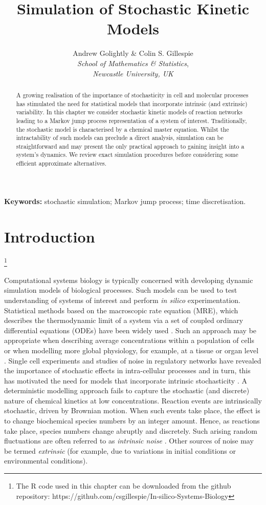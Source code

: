 \documentclass[12pt, DIV12]{scrartcl}
\title{\textbf{Simulation of Stochastic Kinetic Models}}
\author{Andrew Golightly \& Colin S. Gillespie\\ 
\emph{School of Mathematics \& Statistics},\\\emph{Newcastle University, UK}}
\date{}
\begin{document}
\maketitle
\begin{abstract}
  \noindent A growing realisation of the importance of stochasticity in cell and
  molecular processes has stimulated the need for statistical models that
  incorporate intrinsic (and extrinsic) variability. In this chapter we consider
  stochastic kinetic models of reaction networks leading to a Markov jump
  process representation of a system of interest. Traditionally, the stochastic
  model is characterised by a chemical master equation. Whilst the
  intractability of such models can preclude a direct analysis, simulation can
  be straightforward and may present the only practical approach to gaining
  insight into a system's dynamics. We review exact simulation procedures before
  considering some efficient approximate alternatives.
  \end{abstract}
\noindent \textbf{Keywords:} stochastic simulation; Markov jump process; time discretisation.
\section{Introduction}\label{sec:intro}

\let\thefootnote\relax\footnote{The R code used in this chapter can be downloaded
  from the github repository: https://github.com/csgillespie/In-silico-Systems-Biology}

Computational systems biology is typically 
concerned with developing dynamic simulation models of biological processes. 
Such models can be used to test understanding of systems of interest 
and perform \emph{in silico} experimentation. Statistical methods 
based on the macroscopic rate equation (MRE), which describes the thermodynamic 
limit of a system via a set of coupled ordinary differential equations (ODEs) 
have been widely used \citep{deJong02,Finkenstadt08}. Such an approach may be appropriate 
when describing average concentrations within a population of cells or when modelling 
more global physiology, for example, at a tissue or organ level \citep{Calderhead11}. 
Single cell experiments and studies of noise in regulatory networks have revealed the 
importance of stochastic effects in intra-cellular processes and in turn, this 
has motivated the need for models that incorporate intrinsic stochasticity 
\citep{wilkinson2009}. A deterministic modelling approach fails to capture the 
stochastic (and discrete) nature of chemical kinetics at low concentrations. 
Reaction events are intrinsically stochastic, driven by Brownian motion. When such 
events take place, the effect is to change biochemical species numbers by an integer 
amount. Hence, as reactions take place, species numbers change abruptly and discretely. 
Such arising random fluctuations are often referred to as \emph{intrinsic noise} 
\citep{swain2002}. Other sources of noise may be termed \emph{extrinsic} 
(for example, due to variations in initial conditions or environmental 
conditions). 
\end{document}
